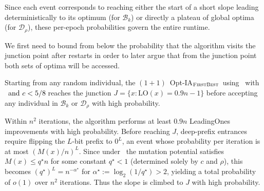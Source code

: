 Since each event corresponds to reaching either the start of a short slope leading deterministically to its optimum (for $\mathcal{B}_k$) or directly a plateau of global optima (for $\mathcal{D}_\rho$), these per-epoch probabilities govern the entire runtime.

We first need to bound from below the probability that the algorithm visits the junction point after restarts in order to later argue that from the junction point both sets of optima will be accessed.

\begin{lemma} \label{lem:junction-first-density-Bk}
	Starting from any random individual, the $(1+1)$~Opt-IA$_{\textsc{FirstBest}}$~using \IPHfcm{}~with \linHD~\textcolor{black}{and $c<5/8$}  reaches the junction $J = \{x : \mathrm{LO}(x)=0.9n-1\}$ before accepting any individual in $\mathcal{B}_k$ or $\mathcal{D}_\rho$ with high probability.
\end{lemma}

Within $n^2$ iterations, the algorithm performs at least $0.9n$ LeadingOnes 
improvements with high probability.  
Before reaching $J$, deep-prefix entrances require flipping the $L$-bit prefix 
to $0^L$, an event whose probability per iteration is at most $(M(x)/n)^L$.  
Since under \linHD\ the mutation potential satisfies $M(x) \le q^\star n$ for 
some constant $q^\star < 1$ (determined solely by $c$ and $\rho$), this becomes 
$(q^\star)^L = n^{-\alpha^\star}$ for $\alpha^\star := \log_2(1/q^\star) > 2$, 
yielding a total probability of $o(1)$ over $n^2$ iterations.
Thus the slope is climbed to $J$ with high probability.


